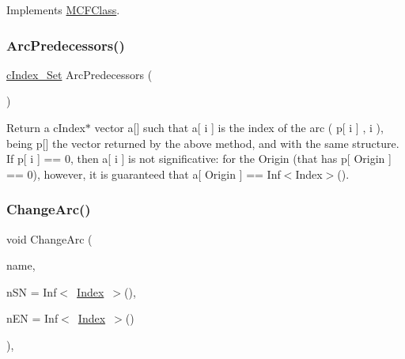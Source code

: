 Implements \mbox{\hyperlink{class_m_c_f_class_a6d58679267d8b620cc3337583dab4626}{M\+C\+F\+Class}}.

\mbox{\label{class_s_p_tree_aaccf9d3766b10881f0b92387e3a9f914}} 
\subsubsection{\texorpdfstring{Arc\+Predecessors()}{ArcPredecessors()}}
{\footnotesize\ttfamily \mbox{\hyperlink{class_m_c_f_class_a81575b2d4e4d5636b17170432150ae69}{c\+Index\+\_\+\+Set}} Arc\+Predecessors (\begin{DoxyParamCaption}\item[{void}]{ }\end{DoxyParamCaption})}

Return a c\+Index$\ast$ vector a\mbox{[}\mbox{]} such that a\mbox{[} i \mbox{]} is the index of the arc ( p\mbox{[} i \mbox{]} , i ), being p\mbox{[}\mbox{]} the vector returned by the above method, and with the same structure. If p\mbox{[} i \mbox{]} == 0, then a\mbox{[} i \mbox{]} is not significative\+: for the Origin (that has p\mbox{[} Origin \mbox{]} == 0), however, it is guaranteed that a\mbox{[} Origin \mbox{]} == Inf$<$\+Index$>$(). \mbox{\label{class_s_p_tree_a23980253602d1183531a93a82d6e7f96}} 
\subsubsection{\texorpdfstring{Change\+Arc()}{ChangeArc()}}
{\footnotesize\ttfamily void Change\+Arc (\begin{DoxyParamCaption}\item[{\mbox{\hyperlink{class_m_c_f_class_a76aaabb20535c51a2752b93f6c38fe54}{c\+Index}}}]{name,  }\item[{\mbox{\hyperlink{class_m_c_f_class_a76aaabb20535c51a2752b93f6c38fe54}{c\+Index}}}]{n\+SN = {\ttfamily Inf$<$~\mbox{\hyperlink{class_m_c_f_class_ad53d6229d7ec28555a9c9c2fd9abf773}{Index}}~$>$()},  }\item[{\mbox{\hyperlink{class_m_c_f_class_a76aaabb20535c51a2752b93f6c38fe54}{c\+Index}}}]{n\+EN = {\ttfamily Inf$<$~\mbox{\hyperlink{class_m_c_f_class_ad53d6229d7ec28555a9c9c2fd9abf773}{Index}}~$>$()} }\end{DoxyParamCaption})\hspace{0.3cm}{\ttfamily [override]}, {\ttfamily [virtual]}}

